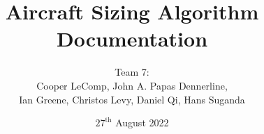 \title{Aircraft Sizing Algorithm Documentation}
\author{Team 7:
\\Cooper LeComp, John A. Papas Dennerline, 
\\Ian Greene, Christos Levy, Daniel Qi, Hans Suganda}
\date{$27^{\text{th}}$ August 2022}
